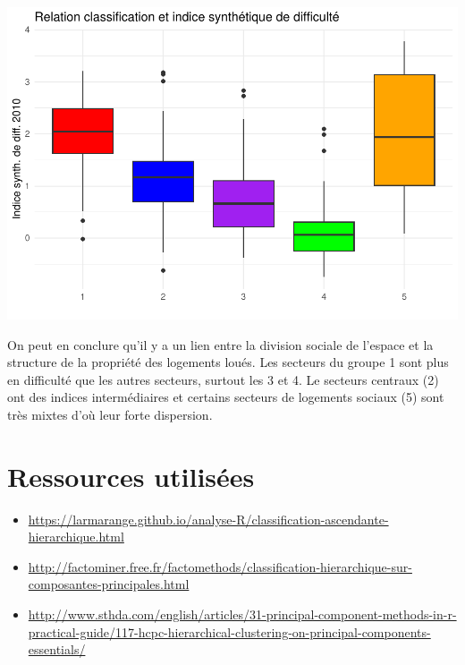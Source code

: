 \documentclass[
]{book}
\begin{document}
\includegraphics{bookdown-demo_files/figure-latex/unnamed-chunk-112-1.pdf}

On peut en conclure qu'il y a un lien entre la division sociale de l'espace et la structure de la propriété des logements loués. Les secteurs du groupe 1 sont plus en difficulté que les autres secteurs, surtout les 3 et 4. Le secteurs centraux (2) ont des indices intermédiaires et certains secteurs de logements sociaux (5) sont très mixtes d'où leur forte dispersion.

\hypertarget{ressources-utilisuxe9es-1}{%
\section{Ressources utilisées}\label{ressources-utilisuxe9es-1}}

\begin{itemize}
\item
  \url{https://larmarange.github.io/analyse-R/classification-ascendante-hierarchique.html}
\item
  \url{http://factominer.free.fr/factomethods/classification-hierarchique-sur-composantes-principales.html}
\item
  \url{http://www.sthda.com/english/articles/31-principal-component-methods-in-r-practical-guide/117-hcpc-hierarchical-clustering-on-principal-components-essentials/}
\end{itemize}

  
\end{document}
